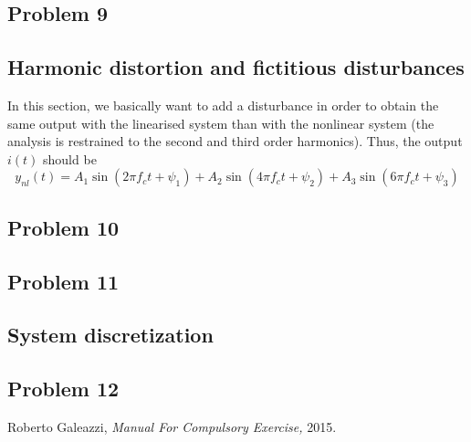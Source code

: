 \documentclass[12pt,a4paper,fleqn, onesside]{report}
\begin{document}
\subsection*{Problem 9}


\subsection{Harmonic distortion and fictitious disturbances}
In this section, we basically want to add a disturbance in order to obtain the same output with the linearised system than with the nonlinear system (the analysis is restrained to the second and third order harmonics). Thus, the output $i(t)$ should be
\begin{equation}
\label{eq:output}
y_{nl}(t)=A_1\sin(2\pi f_ct+\psi_1)+A_2\sin(4\pi f_ct+\psi_2)+A_3\sin(6\pi f_ct+\psi_3)
\end{equation}

\subsection*{Problem 10}


\subsection*{Problem 11}


\subsection{System discretization}
\subsection*{Problem 12}



  \begin{thebibliography}{1}
	 Roberto Galeazzi, {\em Manual For Compulsory Exercise,}  2015.
  \end{thebibliography}
\end{document}
